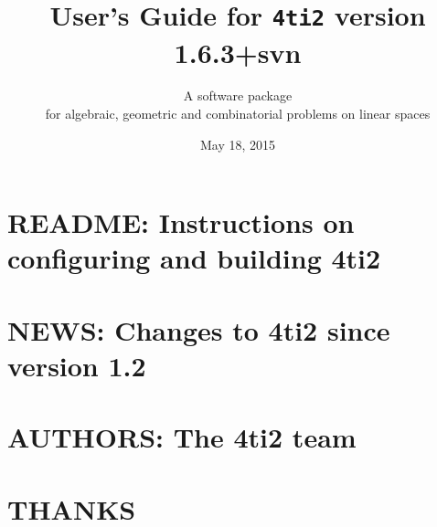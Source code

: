 \documentclass[12pt,a4]{book}
\newcommand{\1}{{\bf 1}}
\newcommand{\FourTiTwo}{{\tt 4ti2}}
\begin{document}
\thispagestyle{empty}

\title{User's Guide for \FourTiTwo{} version 1.6.3+svn}

\author{A software package\\ for algebraic,
geometric and combinatorial problems on linear spaces}
\date{May 18, 2015}

\maketitle

\newpage
\thispagestyle{empty}


\tableofcontents







\chapter{README: Instructions on configuring and building 4ti2}

{\small

}

\chapter{NEWS: Changes to 4ti2 since version 1.2}

{\small

}

\clearpage
{}
\chapter*{AUTHORS: The 4ti2 team}



\clearpage
{}
\chapter*{THANKS}



\clearpage
{}
\providecommand\ISBN{ISBN }



\vfill

\end{document}
